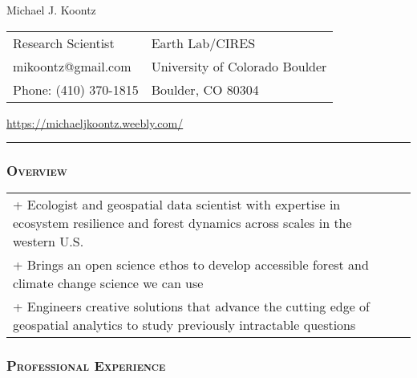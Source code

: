 \documentclass[10pt,english]{article}
\providecommand{\tabularnewline}{\\}
\begin{document}
\begin {center}
{\huge Michael J. Koontz}\tabularnewline
\vspace{1em}

\begin{tabularx}{\textwidth}{@{}>{\raggedright}X >{\raggedleft}X@{}}
Research Scientist & Earth Lab/CIRES \tabularnewline
mikoontz@gmail.com & University of Colorado Boulder \tabularnewline
Phone: (410) 370-1815 & Boulder, CO 80304 
\end{tabularx}

\url{https://michaeljkoontz.weebly.com/}
\end{center}
\vspace{-1.5em}

\rule[0.5ex]{1\linewidth}{0.5pt} 


\subsubsection*{\textsc{Overview}}
\vspace{-0.5ex}

\renewcommand{\arraystretch}{1.2}
\begin{tabularx}{\textwidth}{@{}>{\raggedright}p{6.25in} >{\raggedleft}X@{}}
+ Ecologist and geospatial data scientist with expertise in ecosystem resilience and forest dynamics across scales in the western U.S. &  \tabularnewline
+ Brings an open science ethos to develop accessible forest and climate change science we can use &  \tabularnewline
+ Engineers creative solutions that advance the cutting edge of geospatial analytics to study previously intractable questions &  \tabularnewline
\end{tabularx}


\subsubsection*{\textsc{Professional Experience}}
\vspace{-0.5ex}
\end{document}
